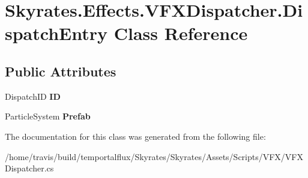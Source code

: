 \hypertarget{class_skyrates_1_1_effects_1_1_v_f_x_dispatcher_1_1_dispatch_entry}{\section{Skyrates.\-Effects.\-V\-F\-X\-Dispatcher.\-Dispatch\-Entry Class Reference}
\label{class_skyrates_1_1_effects_1_1_v_f_x_dispatcher_1_1_dispatch_entry}
}
\subsection*{Public Attributes}
\begin{DoxyCompactItemize}
\item 
\hypertarget{class_skyrates_1_1_effects_1_1_v_f_x_dispatcher_1_1_dispatch_entry_acf94898d3684e6ade3e726b7c91c2631}{Dispatch\-I\-D {\bfseries I\-D}}\label{class_skyrates_1_1_effects_1_1_v_f_x_dispatcher_1_1_dispatch_entry_acf94898d3684e6ade3e726b7c91c2631}

\item 
\hypertarget{class_skyrates_1_1_effects_1_1_v_f_x_dispatcher_1_1_dispatch_entry_a973b39d841e464e6f5347253a12dbcc2}{Particle\-System {\bfseries Prefab}}\label{class_skyrates_1_1_effects_1_1_v_f_x_dispatcher_1_1_dispatch_entry_a973b39d841e464e6f5347253a12dbcc2}

\end{DoxyCompactItemize}


The documentation for this class was generated from the following file\-:\begin{DoxyCompactItemize}
\item 
/home/travis/build/temportalflux/\-Skyrates/\-Skyrates/\-Assets/\-Scripts/\-V\-F\-X/V\-F\-X\-Dispatcher.\-cs\end{DoxyCompactItemize}

